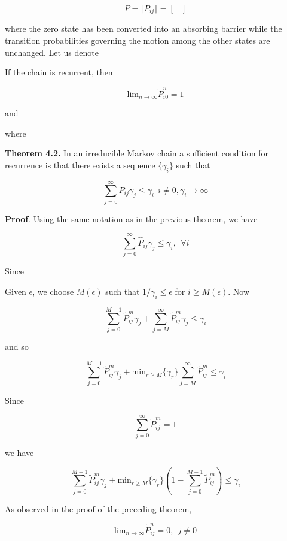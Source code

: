\documentclass[12pt]{article}
\theoremstyle{nonumberbreak}
\begin{document}
$$
P = \Vert P_{ij} \Vert = \begin{bmatrix}
\end{bmatrix}
$$

where the zero state has been converted into an absorbing barrier while the transition probabilities governing the motion among the other states are unchanged. Let us denote 




If the chain is recurrent, then 

$$
\mathrm{lim}_{n\to\infty} \tilde{P}_{i0}^n = 1
$$

and 


where



\begin{theorem}
\textbf{Theorem 4.2.} In an irreducible Markov chain a sufficient condition for recurrence is that there exists a sequence $\{ \gamma_i \}$ such that

$$
\sum_{j=0}^\infty P_{ij} \gamma_j \le \gamma_i \ \ i \neq 0, \gamma_i \to \infty
$$

\end{theorem}

\textbf{Proof}. Using the same notation as in the previous theorem, we have

$$
\sum_{j=0}^\infty \hat{P}_{ij} \gamma_j \le \gamma_i, \ \ \forall i
$$

Since 



Given $\epsilon$, we choose $M(\epsilon)$ such that $1/\gamma_i \le \epsilon$ for $i \ge M(\epsilon)$. Now

$$
\sum_{j=0}^{M-1} \tilde{P}_{ij}^m \gamma_j + \sum_{j=M}^\infty \tilde{P}_{ij}^m \gamma_j \le \gamma_i
$$

and so

$$
\sum_{j=0}^{M-1} \tilde{P}_{ij}^m \gamma_j + \mathrm{min}_{r \ge M} \{ \gamma_r \} \sum_{j=M}^\infty \tilde{P}_{ij}^m \le \gamma_i
$$


Since 

$$
\sum_{j=0}^\infty \tilde{P}_{ij}^m = 1
$$

we have

$$
\sum_{j=0}^{M-1} \tilde{P}_{ij}^m \gamma_j + \mathrm{min}_{r \ge M} \{ \gamma_r \} \left( 1 - \sum_{j=0}^{M-1} \tilde{P}_{ij}^m \right) \le \gamma_i
$$


As observed in the proof of the preceding theorem, 

$$
\mathrm{lim}_{n\to\infty} \tilde{P}^n_{ij} = 0, \ \ j\neq 0
$$
\end{document}

